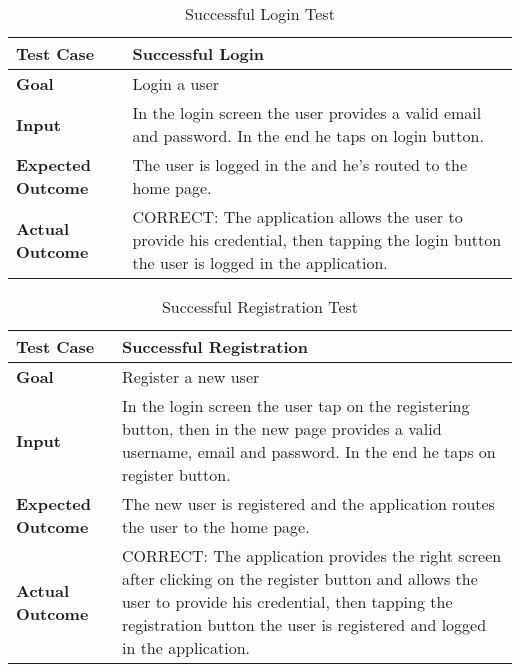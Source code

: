 \begin{table}[H]
	\centering
	\begin{tabular}{|l|l|}
	\hline
	\textbf{Test Case}& Successful Login\\
	\hline
	\textbf{Goal}& Login a user\\
	\hline
	\textbf{Input}& 
	\begin{minipage}{.7\linewidth}
	In the login screen the user provides a valid email and password. In the end he taps on login button.
	\end{minipage}\\
	\hline
	\textbf{Expected Outcome}& The user is logged in the and he's routed to the home page.\\
	\hline
	\textbf{Actual Outcome}& 
	\begin{minipage}{.7\linewidth}
	CORRECT: The application allows the user to provide his credential, then tapping the login button the user is logged in the application.
	\end{minipage}\\
	\hline	
	\end{tabular}
	\caption{Successful Login Test}
\end{table}

\begin{table}[H]
	\centering
	\begin{tabular}{|l|l|}
	\hline
	\textbf{Test Case}& Successful Registration\\
	\hline
	\textbf{Goal}& Register a new user\\
	\hline
	\textbf{Input}& 
	\begin{minipage}{.7\linewidth}
	In the login screen the user tap on the registering button, then in the new page provides a valid username, email and password. In the end he taps on register button.
	\end{minipage}\\
	\hline
	\textbf{Expected Outcome}& 
	\begin{minipage}{.7\linewidth}
	The new user is registered and the application routes the user to the home page.
	\end{minipage}\\
	\hline
	\textbf{Actual Outcome}& 
	\begin{minipage}{.7\linewidth}
	CORRECT: The application provides the right screen after clicking on the register button and allows the user to provide his credential, then tapping the registration button the user is registered and logged in the application.
	\end{minipage}\\
	\hline	
	\end{tabular}
	\caption{Successful Registration Test}
\end{table}

